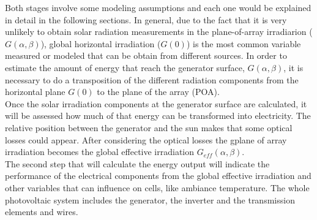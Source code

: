 Both stages involve some modeling assumptions and each one would be explained in detail in the following sections. In general, due to the fact that it is very unlikely to obtain solar radiation measurements in the plane-of-array irradiarion ($G(\alpha, \beta)$), global horizontal irradiation ($G(0)$) is the most common variable measured or modeled that can be obtain from different sources. In order to estimate the amount of energy that reach the generator surface, $G(\alpha, \beta)$, it is necessary to do a transposition of the different radiation components from the horizontal plane $G(0)$ to the plane of the array (POA).\\

Once the solar irradiation components at the generator surface are calculated, it will be assessed how much of that energy can be transformed into electricity. The relative position between the generator and the sun makes that some optical losses could appear. After considering the optical losses the gplane of array irradiation becomes the global effective irradiation $G_{eff}(\alpha, \beta)$.\\

The second step that will calculate the energy output will indicate the performance of the electrical components from the global effective irradiation and other variables that can influence on cells, like ambiance temperature. The whole photovoltaic system includes the generator, the inverter and the transmission elements and wires.\\




